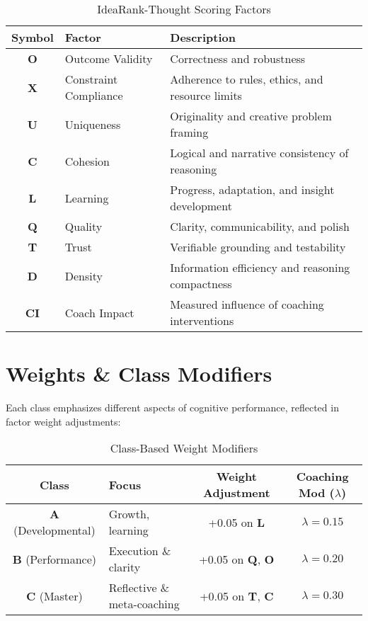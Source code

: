 \begin{table}[h]
\centering
\begin{tabular}{@{}clp{8cm}@{}}
\toprule
\textbf{Symbol} & \textbf{Factor} & \textbf{Description} \\ \midrule
\textbf{O} & Outcome Validity & Correctness and robustness \\
\textbf{X} & Constraint Compliance & Adherence to rules, ethics, and resource limits \\
\textbf{U} & Uniqueness & Originality and creative problem framing \\
\textbf{C} & Cohesion & Logical and narrative consistency of reasoning \\
\textbf{L} & Learning & Progress, adaptation, and insight development \\
\textbf{Q} & Quality & Clarity, communicability, and polish \\
\textbf{T} & Trust & Verifiable grounding and testability \\
\textbf{D} & Density & Information efficiency and reasoning compactness \\
\textbf{CI} & Coach Impact & Measured influence of coaching interventions \\ \bottomrule
\end{tabular}
\caption{IdeaRank-Thought Scoring Factors}
\label{tab:scoring_factors}
\end{table}

\section{Weights \& Class Modifiers}

Each class emphasizes different aspects of cognitive performance, reflected in factor weight adjustments:

\begin{table}[h]
\centering
\begin{tabular}{@{}clcc@{}}
\toprule
\textbf{Class} & \textbf{Focus} & \textbf{Weight Adjustment} & \textbf{Coaching Mod ($\lambda$)} \\ \midrule
\textbf{A} (Developmental) & Growth, learning & +0.05 on \textbf{L} & $\lambda = 0.15$ \\
\textbf{B} (Performance) & Execution \& clarity & +0.05 on \textbf{Q}, \textbf{O} & $\lambda = 0.20$ \\
\textbf{C} (Master) & Reflective \& meta-coaching & +0.05 on \textbf{T}, \textbf{C} & $\lambda = 0.30$ \\ \bottomrule
\end{tabular}
\caption{Class-Based Weight Modifiers}
\label{tab:class_modifiers}
\end{table}

